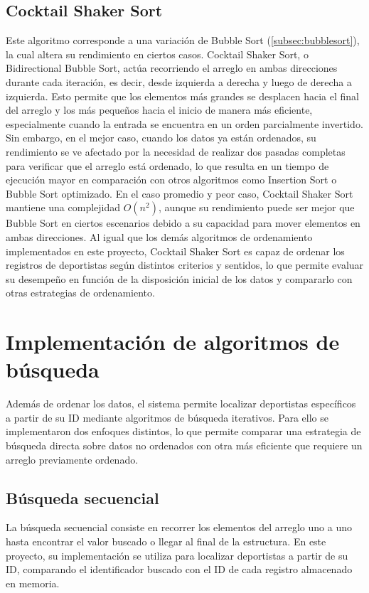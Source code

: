 \subsection{Cocktail Shaker Sort}
Este algoritmo corresponde a una variación de Bubble Sort (\ref{subsec:bubblesort}), la cual altera su rendimiento en ciertos casos. Cocktail Shaker Sort, o Bidirectional Bubble Sort, actúa recorriendo el arreglo en ambas direcciones durante cada iteración, es decir, desde izquierda a derecha y luego de derecha a izquierda. Esto permite que los elementos más grandes se desplacen hacia el final del arreglo y los más pequeños hacia el inicio de manera más eficiente, especialmente cuando la entrada se encuentra en un orden parcialmente invertido. Sin embargo, en el mejor caso, cuando los datos ya están ordenados, su rendimiento se ve afectado por la necesidad de realizar dos pasadas completas para verificar que el arreglo está ordenado, lo que resulta en un tiempo de ejecución mayor en comparación con otros algoritmos como Insertion Sort o Bubble Sort optimizado. En el caso promedio y peor caso, Cocktail Shaker Sort mantiene una complejidad \(O(n^2)\), aunque su rendimiento puede ser mejor que Bubble Sort en ciertos escenarios debido a su capacidad para mover elementos en ambas direcciones.
Al igual que los demás algoritmos de ordenamiento implementados en este proyecto, Cocktail Shaker Sort es capaz de ordenar los registros de deportistas según distintos criterios y sentidos, lo que permite evaluar su desempeño en función de la disposición inicial de los datos y compararlo con otras estrategias de ordenamiento.

\section{Implementación de algoritmos de búsqueda}
Además de ordenar los datos, el sistema permite localizar deportistas específicos a partir de su ID mediante algoritmos de búsqueda iterativos. Para ello se implementaron dos enfoques distintos, lo que permite comparar una estrategia de búsqueda directa sobre datos no ordenados con otra más eficiente que requiere un arreglo previamente ordenado.

\subsection{Búsqueda secuencial}
La búsqueda secuencial consiste en recorrer los elementos del arreglo uno a uno hasta encontrar el valor buscado o llegar al final de la estructura. En este proyecto, su implementación se utiliza para localizar deportistas a partir de su ID, comparando el identificador buscado con el ID de cada registro almacenado en memoria.

